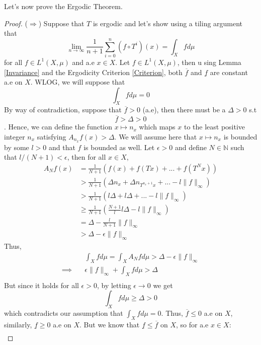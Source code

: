 \documentclass{article}
\theoremstyle{definition}
\begin{document}
Let's now prove the Ergodic Theorem.

\begin{proof}
    ($\Rightarrow$) Suppose that $T$ is ergodic and let's show using a tiling argument that $$\lim_{n\to\infty}\frac{1}{n+1}\sum_{i=0}^n(f\circ T^i)(x)=\int_Xfd\mu$$
    for all $f\in L^1(X,\mu)$ and a.e $x\in X$. Let $f\in L^1(X,\mu)$, then u   sing Lemma \ref{Invariance} and the Ergodicity Criterion \ref{Criterion}, both $\overline{f}$ and $\underline{f}$ are constant a.e on $X$. WLOG, we will suppose that $$\int_Xfd\mu = 0$$
    By way of contradiction, suppose that $\overline{f} > 0$ (a.e), then there must be a $\Delta > 0$ s.t $$\overline{f} > \Delta > 0$$. Hence, we can define the function $x\mapsto n_x$ which maps $x$ to the least positive integer $n_x$ satisfying $A_{n_x}f(x)>\Delta$. We will assume here that $x\mapsto n_x$ is bounded by some $l>0$ and that $f$ is bounded as well. Let $\epsilon >0$ and define $N\in \mathbb{N}$ such that $l/(N+1) < \epsilon$, then for all $x\in X$,
    \begin{align*}
        A_Nf(x) &= \frac{1}{N+1}\left( f(x) + f(Tx) + ... + f(T^Nx) \right) \\
        & > \frac{1}{N+1}\left( \Delta n_x + \Delta n_{T^{n_x+1}x}  + ... -l\lVert f \rVert_{\infty} \right) \\
        & > \frac{1}{N+1}\left( l\Delta + l\Delta + ... -l\lVert f \rVert_{\infty} \right) \\
        & \geq \frac{1}{N+1}\left( \frac{N+1}{l}l\Delta -l\lVert f \rVert_{\infty} \right) \\
        &= \Delta - \frac{l}{N+1}\lVert f \rVert_{\infty} \\
        & > \Delta - \epsilon\lVert f \rVert_{\infty}
    \end{align*}
    Thus,
    \begin{align*}
        & \int_Xfd\mu = \int_XA_Nfd\mu > \Delta - \epsilon\lVert f \rVert_{\infty} \\
        \implies\quad & \epsilon\lVert f \rVert_{\infty} + \int_Xfd\mu > \Delta \\
    \end{align*}
    But since it holds for all $\epsilon > 0$, by letting $\epsilon \to 0$ we get 
    $$\int_Xfd\mu \geq \Delta > 0$$
    which contradicts our assumption that $\int_Xfd\mu = 0$.
    Thus, $\overline{f} \leq 0$ a.e on $X$, similarly, $\underline{f} \geq 0$ a.e on $X$. But we know that $\underline{f} \leq\overline{f}$ on $X$, so for a.e $x\in X$:
    \begin{align*}

\end{align*}
\end{proof}
\end{document}
